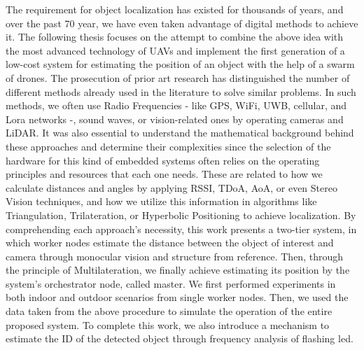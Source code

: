 \begin{extraAbstract}
	\addchaptertocentry{\abstractname} %
	The requirement for object localization has existed for thousands of years, and over the past 70 year, we have even taken advantage of digital methods to achieve it.
	The following thesis focuses on the attempt to combine the above idea with the most advanced technology of UAVs and implement the first generation of a low-cost system for estimating the position of an object with the help of a swarm of drones.
	The prosecution of prior art research has distinguished the number of different methods already used in the literature to solve similar problems.
	In such methods, we often use Radio Frequencies - like GPS, WiFi, UWB, cellular, and Lora networks -, sound waves, or vision-related ones by operating cameras and LiDAR.
	It was also essential to understand the mathematical background behind these approaches and determine their complexities since the selection of the hardware for this kind of embedded systems often relies on the operating principles and resources that each one needs.
	 These are related to how we calculate distances and angles by applying RSSI, TDoA, AoA, or even Stereo Vision techniques, and how we utilize this information in algorithms like Triangulation, Trilateration, or Hyperbolic Positioning to achieve localization.
	By comprehending each approach’s necessity, this work presents a two-tier system, in which worker nodes estimate the distance between the object of interest and camera through monocular vision and structure from reference. Then, through the principle of Multilateration, we finally achieve estimating its position by the system’s orchestrator node, called master.
	We first performed experiments in both indoor and outdoor scenarios from single worker nodes. Then, we used the data taken from the above procedure to simulate the operation of the entire proposed system. To complete this work, we also introduce a mechanism to estimate the ID of the detected object through frequency analysis of flashing led.
\end{extraAbstract}
